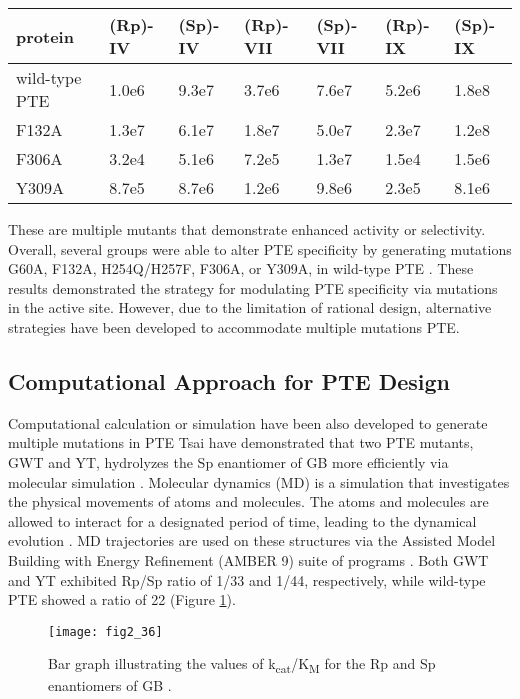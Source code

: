 \begin{refsection}
\begin{table}[htbp]
\begin{tabular}{lllllll}
    protein & (Rp)-IV & (Sp)-IV & (Rp)-VII & (Sp)-VII & (Rp)-IX & (Sp)-IX \\
    \hline

    wild-type PTE & 1.0e6 & 9.3e7 & 3.7e6 & 7.6e7 & 5.2e6 & 1.8e8 \\
    F132A & 1.3e7 & 6.1e7 & 1.8e7 & 5.0e7 & 2.3e7 & 1.2e8 \\
    F306A & 3.2e4 & 5.1e6 & 7.2e5 & 1.3e7 & 1.5e4 & 1.5e6 \\
    Y309A & 8.7e5 & 8.7e6 & 1.2e6 & 9.8e6 & 2.3e5 & 8.1e6 \\

    \hline  
    \end{tabular} 
    \label{tab:pte-leaving}
\end{table}

These are multiple mutants that demonstrate enhanced activity or selectivity.
Overall, several groups were able to alter PTE specificity by generating
mutations G60A, F132A, H254Q/H257F, F306A, or Y309A, in wild-type PTE
\cite{Chen-Goodspeed2001a,Hanusa2011,Aubert2004b,Chen-Goodspeed2001a,Bigley2013}.
These results demonstrated the strategy for modulating PTE specificity via
mutations in the active site. However, due to the limitation of rational
design, alternative strategies have been developed to accommodate multiple
mutations PTE.

\subsection{Computational Approach for PTE Design}

Computational calculation or simulation have been also developed to generate
multiple mutations in PTE \cite{Tsai2010a,Cherny2013} Tsai 
have demonstrated that two PTE mutants, GWT and YT, hydrolyzes the Sp
enantiomer of GB more efficiently via molecular simulation \cite{Tsai2010a}.
Molecular dynamics (MD) is a simulation that investigates the physical
movements of atoms and molecules. The atoms and molecules are allowed to
interact for a designated period of time, leading to the dynamical evolution
\cite{Gordon1999b}.  MD trajectories are used on these structures via the
Assisted Model Building with Energy Refinement (AMBER 9) suite of programs
\cite{Tsai2010a}. Both GWT and YT exhibited Rp/Sp ratio of 1/33 and 1/44,
respectively, while wild-type PTE showed a ratio of 22 \cite{Tsai2010a} (Figure
\ref{fig:gwt-gb}). 
\begin{figure}[htbp] \centering \texttt{[image: fig2\_36]}
    \caption[Bar graph illustrating the values of
    k\textsubscript{cat}/K\textsubscript{M} for the Rp and Sp enantiomers of
GB.]{Bar graph illustrating the values of
    k\textsubscript{cat}/K\textsubscript{M} for the Rp and Sp enantiomers of GB
    \cite{Tsai2010a}.} \label{fig:gwt-gb}
\end{figure}


\end{refsection}

